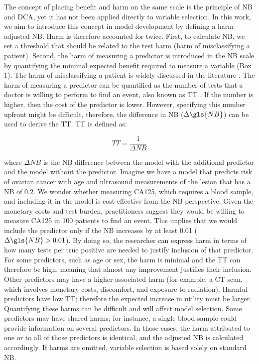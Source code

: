 The concept of placing benefit and harm on the same scale is the principle of \gls{NB} and \gls{DCA}, yet it has not been applied directly to variable selection. In this work, we aim to introduce this concept in model development by defining a harm adjusted \gls{NB}. Harm is therefore accounted for twice. First, to calculate \gls{NB}, we set a threshold that should be related to the test harm (harm of misclassifying a patient). Second, the harm of measuring a predictor is introduced in the \gls{NB} scale by quantifying the minimal expected benefit required to measure a variable (Box 1). The harm of misclassifying a patient is widely discussed in the literature \cite{vickersSimpleStepbystepGuide2019,vickersDecisionCurveAnalysis2006}. The harm of measuring a predictor can be quantified as the number of tests that a doctor is willing to perform to find an event, also known as \gls{TT} \cite{vancalsterReportingInterpretingDecision2018}. If the number is higher, then the cost of the predictor is lower. However, specifying this number upfront might be difficult, therefore, the difference in \gls{NB} ($\Delta \gls{NB}$) can be used to derive the \gls{TT}. \gls{TT} is defined as:

\begin{equation}
TT = \frac{1}{\Delta NB}
\end{equation}

where $\Delta NB$ is the \gls{NB} difference between the model with the additional predictor and the model without the predictor. Imagine we have a model that predicts risk of ovarian cancer with age and ultrasound measurements of the lesion that has a \gls{NB} of 0.2. We wonder whether measuring CA125, which requires a blood sample, and including it in the model is cost-effective from the \gls{NB} perspective. Given the monetary costs and test burden, practitioners suggest they would be willing to measure CA125 in 100 patients to find an event. This implies that we would include the predictor only if the \gls{NB} increases by at least 0.01 ($\Delta \gls{NB} > 0.01$). By doing so, the researcher can express harm in terms of how many tests per true positive are needed to justify inclusion of that predictor. For some predictors, such as age or sex, the harm is minimal and the TT can therefore be high, meaning that almost any improvement justifies their inclusion. Other predictors may have a higher associated harm (for example, a CT scan, which involves monetary costs, discomfort, and exposure to radiation). Harmful predictors have low TT; therefore the expected increase in utility must be larger. Quantifying these harms can be difficult and will affect model selection. Some predictors may have shared harms; for instance, a single blood sample could provide information on several predictors. In those cases, the harm attributed to one or to all of those predictors is identical, and the adjusted \gls{NB} is calculated accordingly. If harms are omitted, variable selection is based solely on standard \gls{NB}.

